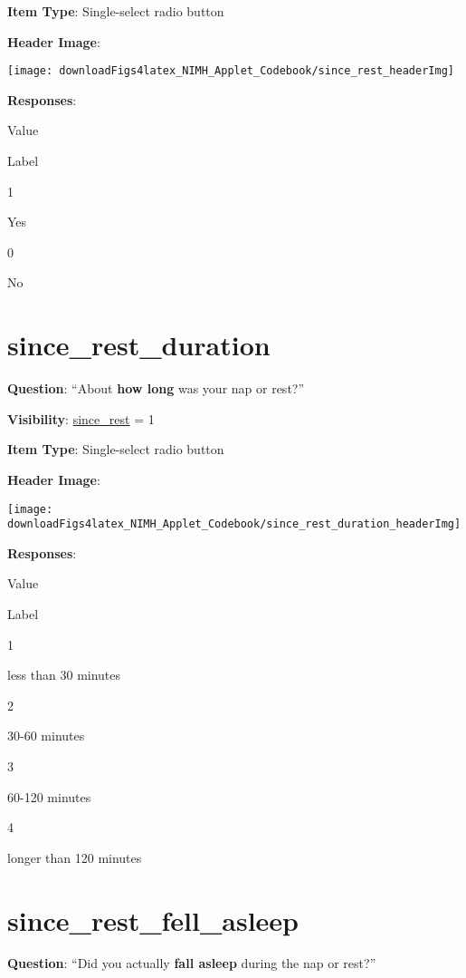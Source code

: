 \documentclass[]{book}
\begin{document}
\textbf{Item Type}: Single-select radio button

\textbf{Header Image}:

\begin{flushleft}\texttt{[image: downloadFigs4latex\_NIMH\_Applet\_Codebook/since\_rest\_headerImg]} \end{flushleft}

\textbf{Responses}:

Value

Label

1

Yes

0

No

\hypertarget{since_rest_duration}{%
\section{since\_rest\_duration}\label{since_rest_duration}}

\textbf{Question}: ``About \textbf{how long} was your nap or rest?''

\textbf{Visibility}: \protect\hyperlink{since_rest}{since\_rest} = 1

\textbf{Item Type}: Single-select radio button

\textbf{Header Image}:

\begin{flushleft}\texttt{[image: downloadFigs4latex\_NIMH\_Applet\_Codebook/since\_rest\_duration\_headerImg]} \end{flushleft}

\textbf{Responses}:

Value

Label

1

less than 30 minutes

2

30-60 minutes

3

60-120 minutes

4

longer than 120 minutes

\hypertarget{since_rest_fell_asleep}{%
\section{since\_rest\_fell\_asleep}\label{since_rest_fell_asleep}}

\textbf{Question}: ``Did you actually \textbf{fall asleep} during the nap or rest?''
\end{document}
